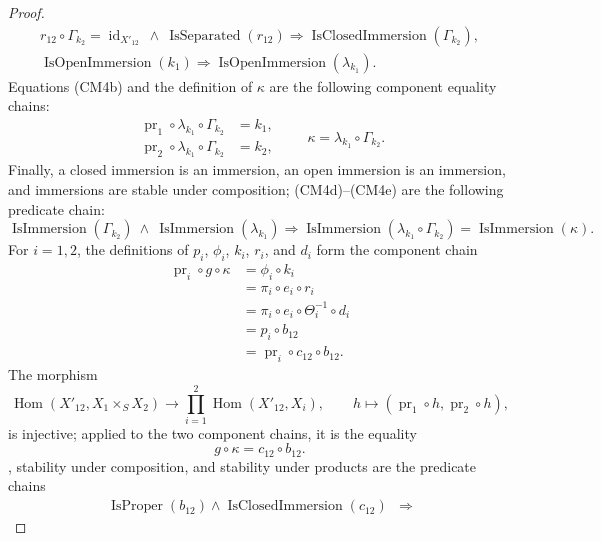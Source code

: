 \begin{proof}
\[\begin{gathered}
    r_{12}\circ\Gamma_{k_2}=\operatorname{id}_{X'_{12}}
      \ \wedge\ \operatorname{IsSeparated}(r_{12})
      \Longrightarrow\operatorname{IsClosedImmersion}(\Gamma_{k_2}),\\
    \operatorname{IsOpenImmersion}(k_1)
      \Longrightarrow\operatorname{IsOpenImmersion}(\lambda_{k_1}). 
  \end{gathered} \tag{CM4d}
  \]
  Equations (CM4b) and the definition of $\kappa$ are the following component
  equality chains:
  \[
  \begin{aligned}
    \operatorname{pr}_1\circ\lambda_{k_1}\circ\Gamma_{k_2}
      &=k_1,\\
    \operatorname{pr}_2\circ\lambda_{k_1}\circ\Gamma_{k_2}
      &=k_2,
  \end{aligned}
  \qquad
    \kappa=\lambda_{k_1}\circ\Gamma_{k_2}.                     \tag{CM4e}
  \]
  Finally, a closed immersion is an immersion, an open immersion is an
  immersion, and immersions are stable under composition; (CM4d)--(CM4e) are
  the following predicate chain:
  \[
    \operatorname{IsImmersion}(\Gamma_{k_2})\ \wedge\
      \operatorname{IsImmersion}(\lambda_{k_1})
      \Longrightarrow
      \operatorname{IsImmersion}(\lambda_{k_1}\circ\Gamma_{k_2})
      =\operatorname{IsImmersion}(\kappa).                       \tag{CM4f}
  \]
  For
  $i=1,2$, the definitions of $p_i$, $\phi_i$, $k_i$, $r_i$, and $d_i$ form
  the component chain
  \[
  \begin{aligned}
    \operatorname{pr}_i\circ g\circ\kappa
      &=\phi_i\circ k_i\\
      &=\pi_i\circ e_i\circ r_i\\
      &=\pi_i\circ e_i\circ\Theta_i^{-1}\circ d_i\\
      &=p_i\circ b_{12}\\
      &=\operatorname{pr}_i\circ c_{12}\circ b_{12}.
  \end{aligned}
  \]
  The morphism
  \[
    \operatorname{Hom}(X'_{12},X_1\times_SX_2)
      \longrightarrow
    \prod_{i=1}^2\operatorname{Hom}(X'_{12},X_i),\qquad
    h\longmapsto(\operatorname{pr}_1\circ h,
      \operatorname{pr}_2\circ h),
  \]
  is injective; applied to the two component chains, it is the equality
  \[
    g\circ\kappa=c_{12}\circ b_{12}.
  \]
  , stability under composition, and
  stability under products are the predicate chains
  \[
  \begin{aligned}
    \operatorname{IsProper}(b_{12})
      \wedge\operatorname{IsClosedImmersion}(c_{12})
      &\Longrightarrow

\end{aligned}\]
\end{proof}
